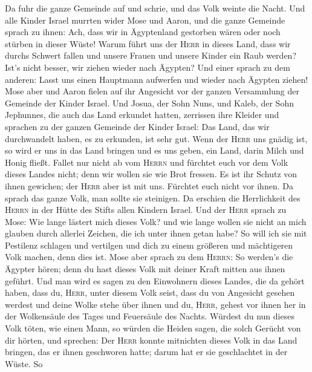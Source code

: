  Da fuhr die ganze Gemeinde auf und schrie, und das Volk
weinte die Nacht.  Und alle Kinder Israel murrten wider
Mose und Aaron, und die ganze Gemeinde sprach zu ihnen: Ach, dass wir in
Ägyptenland gestorben wären oder noch stürben in dieser Wüste!
 Warum führt uns der \textsc{Herr} in dieses Land, dass
wir durchs Schwert fallen und unsere Frauen und unsere Kinder ein Raub
werden? Ist's nicht besser, wir ziehen wieder nach Ägypten?
 Und einer sprach zu dem anderen: Lasst uns einen
Hauptmann aufwerfen und wieder nach Ägypten ziehen!  Mose
aber und Aaron fielen auf ihr Angesicht vor der ganzen Versammlung der
Gemeinde der Kinder Israel.  Und Josua, der Sohn Nuns, und
Kaleb, der Sohn Jephunnes, die auch das Land erkundet hatten, zerrissen
ihre Kleider  und sprachen zu der ganzen Gemeinde der
Kinder Israel: Das Land, das wir durchwandelt haben, es zu erkunden, ist
sehr gut.  Wenn der \textsc{Herr} uns gnädig ist, so wird
er uns in das Land bringen und es uns geben, ein Land, darin Milch und
Honig fließt.  Fallet nur nicht ab vom \textsc{Herrn} und
fürchtet euch vor dem Volk dieses Landes nicht; denn wir wollen sie wie
Brot fressen. Es ist ihr Schutz von ihnen gewichen; der \textsc{Herr}
aber ist mit uns. Fürchtet euch nicht vor ihnen.  Da
sprach das ganze Volk, man sollte sie steinigen. Da erschien die
Herrlichkeit des \textsc{Herrn} in der Hütte des Stifts allen Kindern
Israel.  Und der \textsc{Herr} sprach zu Mose: Wie lange
lästert mich dieses Volk? und wie lange wollen sie nicht an mich glauben
durch allerlei Zeichen, die ich unter ihnen getan habe? 
So will ich sie mit Pestilenz schlagen und vertilgen und dich zu einem
größeren und mächtigeren Volk machen, denn dies ist. 
Mose aber sprach zu dem \textsc{Herrn}: So werden's die Ägypter hören;
denn du hast dieses Volk mit deiner Kraft mitten aus ihnen geführt.
 Und man wird es sagen zu den Einwohnern dieses Landes,
die da gehört haben, dass du, \textsc{Herr}, unter diesem Volk seist,
dass du von Angesicht gesehen werdest und deine Wolke stehe über ihnen
und du, \textsc{Herr}, gehest vor ihnen her in der Wolkensäule des Tages
und Feuersäule des Nachts.  Würdest du nun dieses Volk
töten, wie einen Mann, so würden die Heiden sagen, die solch Gerücht von
dir hörten, und sprechen:  Der \textsc{Herr} konnte
mitnichten dieses Volk in das Land bringen, das er ihnen geschworen
hatte; darum hat er sie geschlachtet in der Wüste.  So
